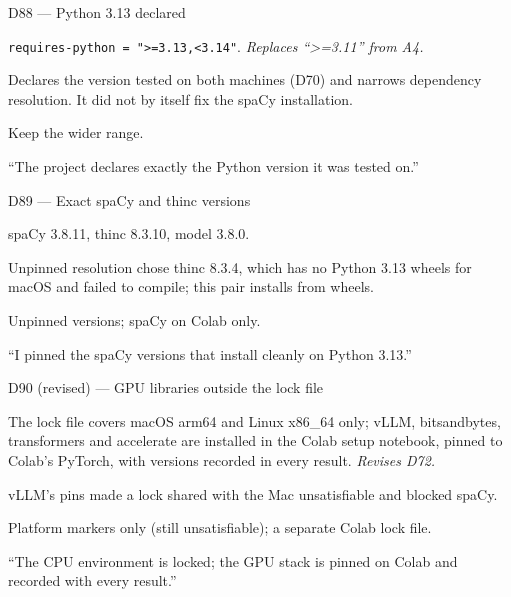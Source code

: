 \documentclass[11pt,a4paper]{report}
\begin{document}
\begin{decisionbox}{D88 --- Python 3.13 declared}
\begin{description}[nosep, leftmargin=0pt]
  \item[Decision.] \texttt{requires-python = ">=3.13,<3.14"}. \emph{Replaces ``>=3.11'' from A4.}
  \item[Why.] Declares the version tested on both machines (D70) and narrows dependency resolution. It did not by itself fix the spaCy installation.
  \item[Alternatives.] Keep the wider range.
  \item[Interview line.] ``The project declares exactly the Python version it was tested on.''
\end{description}
\end{decisionbox}

\begin{decisionbox}{D89 --- Exact spaCy and thinc versions}
\begin{description}[nosep, leftmargin=0pt]
  \item[Decision.] spaCy 3.8.11, thinc 8.3.10, model 3.8.0.
  \item[Why.] Unpinned resolution chose thinc 8.3.4, which has no Python 3.13 wheels for macOS and failed to compile; this pair installs from wheels.
  \item[Alternatives.] Unpinned versions; spaCy on Colab only.
  \item[Interview line.] ``I pinned the spaCy versions that install cleanly on Python 3.13.''
\end{description}
\end{decisionbox}

\begin{decisionbox}{D90 (revised) --- GPU libraries outside the lock file}
\begin{description}[nosep, leftmargin=0pt]
  \item[Decision.] The lock file covers macOS arm64 and Linux x86\_64 only; vLLM, bitsandbytes, transformers and accelerate are installed in the Colab setup notebook, pinned to Colab's PyTorch, with versions recorded in every result. \emph{Revises D72.}
  \item[Why.] vLLM's pins made a lock shared with the Mac unsatisfiable and blocked spaCy.
  \item[Alternatives.] Platform markers only (still unsatisfiable); a separate Colab lock file.
  \item[Interview line.] ``The CPU environment is locked; the GPU stack is pinned on Colab and recorded with every result.''
\end{description}
\end{decisionbox}
\end{document}
